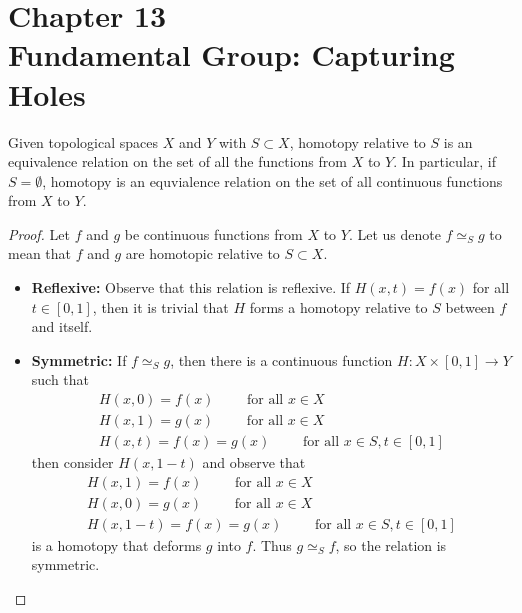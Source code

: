 \documentclass[a4paper,12pt,twoside]{hmcpset}
\begin{document}
\section*{Chapter 13\\ Fundamental Group: Capturing Holes}

\noindent

\begin{problem}[Theorem 13.2] 
    Given topological spaces $X$ and $Y$ with $S \subset X$, 
    homotopy relative to $S$ is an equivalence relation on the set of
    all the functions from $X$ to $Y$. In particular, if $S =
    \emptyset$, homotopy is an equvialence relation on the set of all
    continuous functions from $X$ to $Y$.
\end{problem}

\begin{proof}
    Let $f$ and $g$ be continuous functions from $X$ to $Y$. 
    Let us denote $f \simeq_S g$ to mean that $f$ and $g$ are homotopic
    relative to $S \subset X$.
    \begin{itemize}
        \item \textbf{Reflexive:} 
        Observe that this relation is reflexive. If $H(x, t) = f(x)$
        for all $t \in [0, 1]$, then it is trivial that $H$ forms a
        homotopy relative to $S$ between $f$ and itself.

        \item \textbf{Symmetric:} If $f \simeq_S g$, then there is a
        continuous function $H: X \times [0, 1] \to Y$ such that
        \begin{gather*}
            H(x, 0) = f(x) \qquad \text{ for all } x \in X\\
            H(x, 1) = g(x) \qquad \text{ for all } x \in X\\
            H(x, t) = f(x) = g(x) \qquad \text{ for all } x \in S, t \in [0, 1]
        \end{gather*}
        then consider $H(x, 1 -t)$ and observe that
        \begin{gather*}
            H(x, 1) = f(x) \qquad \text{ for all } x \in X\\
            H(x, 0) = g(x) \qquad \text{ for all } x \in X\\
            H(x, 1 - t) = f(x) = g(x) \qquad \text{ for all } x \in S, t \in [0, 1]
        \end{gather*}
        is a homotopy that deforms $g$ into $f$. Thus $g \simeq_S f$, so
        the relation is symmetric.


\end{itemize}
\end{proof}
\end{document}
